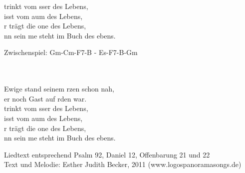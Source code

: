 \begin{tabbing}
 trinkt vom sser des Lebens,\\
 isst vom aum des Lebens,\\
r trägt die one des Lebens,\\
nn sein me steht im Buch des ebens.\>
\begin{footnotesize}Zwischenspiel: Gm-Cm-F7-B - Es-F7-B-Gm\end{footnotesize}\\
\\
 Ewige stand seinem rzen schon nah,\\
 er noch Gast auf rden war.\\
 trinkt vom sser des Lebens,\\
 isst vom aum des Lebens,\\
r trägt die one des Lebens,\\
nn sein me steht im Buch des ebens.\\ 
\end{tabbing}
\begin{footnotesize}
Liedtext entsprechend Psalm 92, Daniel 12, Offenbarung 21 und 22\\
Text und Melodie: Esther Judith Becker, 2011 (www.logospanoramasongs.de)
\end{footnotesize}